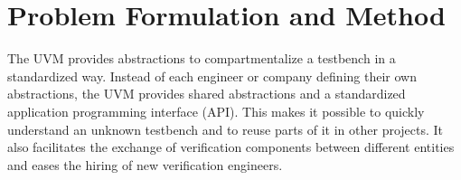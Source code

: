 \chapter{Problem Formulation and Method} %

The UVM provides abstractions to compartmentalize a testbench in a standardized way. Instead of each engineer or
company defining their own abstractions, the UVM provides shared abstractions and a standardized application
programming interface (API). This makes it possible to quickly
understand an unknown testbench and to reuse parts of it in other projects. It also facilitates the exchange of
verification components between different entities and eases the hiring of new verification engineers.

